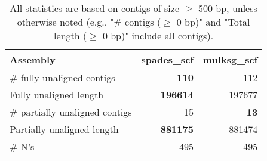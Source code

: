 \documentclass[12pt,a4paper]{article}
\begin{document}
\begin{table}[ht]
\begin{center}
\caption{All statistics are based on contigs of size $\geq$ 500 bp, unless otherwise noted (e.g., "\# contigs ($\geq$ 0 bp)" and "Total length ($\geq$ 0 bp)" include all contigs).}
\begin{tabular}{|l*{2}{|r}|}
\hline
Assembly & spades\_scf & mulksg\_scf \\ \hline
\# fully unaligned contigs & {\bf 110} & 112 \\ \hline
Fully unaligned length & {\bf 196614} & 197677 \\ \hline
\# partially unaligned contigs & 15 & {\bf 13} \\ \hline
Partially unaligned length & {\bf 881175} & 881474 \\ \hline
\# N's & 495 & 495 \\ \hline
\end{tabular}
\end{center}
\end{table}
\end{document}
